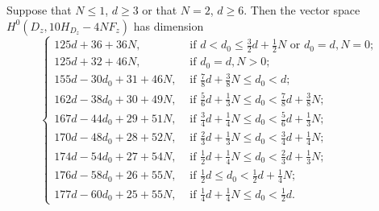 \documentclass[10pt,a4paper]{amsart}
\begin{document}
\begin{lem} \label{lem: dimension 10H}
	Suppose that $N \le 1$, $d \ge 3$ or that $N = 2$, $d \ge 6$. Then the vector space $H^0(D_z, 10H_{D_z} - 4NF_z)$ has dimension
    $$
    \begin{cases}
        125d + 36 + 36N, & \text{ if } d < d_0 \le \frac32d + \frac12N \text{ or } d_0=d, N=0;\\ 
		125d + 32 + 46N, & \text{ if } d_0 = d, N>0; \\
		155d - 30d_0 + 31 + 46N, & \text{ if } \frac78d + \frac38 N \le d_0 < d;\\ 
		162d - 38d_0 + 30 + 49N, & \text{ if } \frac56d + \frac13 N \le d_0 < \frac78d + \frac38 N;\\ 
		167d - 44d_0 + 29 + 51N, & \text{ if } \frac34d + \frac14 N \le d_0 < \frac56d + \frac13 N;\\ 
		170d - 48d_0 + 28 + 52N, & \text{ if } \frac23d + \frac13 N \le d_0 < \frac34d + \frac14 N;\\ 
		174d - 54d_0 + 27 + 54N, & \text{ if } \frac12d + \frac14 N \le d_0 < \frac23d + \frac13 N;\\
		176d - 58d_0 + 26 + 55N, & \text{ if } \frac12d \le d_0 < \frac12d + \frac14 N;\\
		177d - 60d_0 + 25 + 55N, & \text{ if } \frac14d + \frac14 N \le d_0 < \frac12d. 	 
    \end{cases}
    $$
\end{lem}
\end{document}
